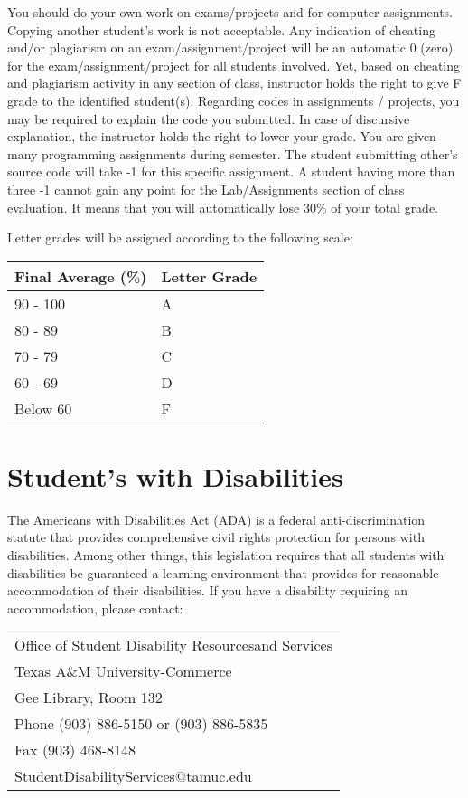 \documentclass[11pt]{article}
\begin{document}
You should do your own work on exams/projects and for computer
assignments. Copying another student’s work is not acceptable. Any
indication of cheating and/or plagiarism on an exam/assignment/project
will be an automatic 0 (zero) for the exam/assignment/project for all
students involved. Yet, based on cheating and plagiarism activity in
any section of class, instructor holds the right to give F grade to
the identified student(s). Regarding codes in assignments / projects,
you may be required to explain the code you submitted. In case of
discursive explanation, the instructor holds the right to lower your
grade. You are given many programming assignments during semester. The
student submitting other’s source code will take -1 for this specific
assignment. A student having more than three -1 cannot gain any point
for the Lab/Assignments section of class evaluation. It means that you
will automatically lose 30\% of your total grade.

Letter grades will be assigned according to the following scale:


\begin{center}
\begin{tabular*}{0.9\textwidth}{ll}
 Final Average (\%)  &  Letter Grade  \\
\hline
 90 - 100            &  A             \\
 80 - 89             &  B             \\
 70 - 79             &  C             \\
 60 - 69             &  D             \\
 Below 60            &  F             \\
\end{tabular*}
\end{center}
\section*{Student's with Disabilities}
\label{sec-7}


The Americans with Disabilities Act (ADA) is a federal
anti-discrimination statute that provides comprehensive civil rights
protection for persons with disabilities.  Among other things, this
legislation requires that all students with disabilities be guaranteed
a learning environment that provides for reasonable accommodation of
their disabilities.  If you have a disability requiring an
accommodation, please contact: 


\begin{center}
\begin{tabular*}{0.9\textwidth}{l}
 Office of Student Disability Resourcesand Services  \\
 Texas A\&M University-Commerce                      \\
 Gee Library, Room 132                               \\
 Phone (903) 886-5150 or (903) 886-5835              \\
 Fax (903) 468-8148                                  \\
 StudentDisabilityServices@tamuc.edu                 \\
\end{tabular*}
\end{center}
\end{document}
